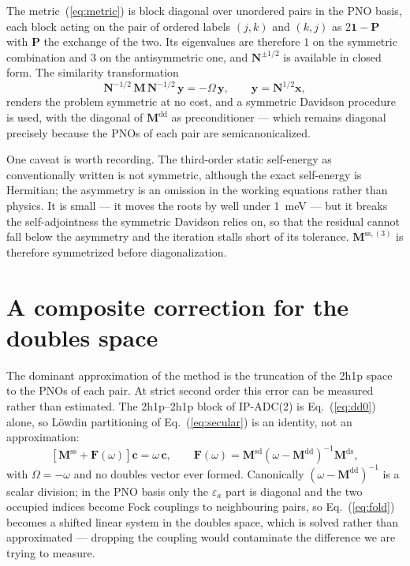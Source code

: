 \documentclass[aip,jcp,amsmath,amssymb,preprint,superscriptaddress]{revtex4-2}%
\newcommand{\Mss}{\mathbf{M}^{\text{ss}}}
\newcommand{\Msd}{\mathbf{M}^{\text{sd}}}
\newcommand{\Mds}{\mathbf{M}^{\text{ds}}}
\newcommand{\Mdd}{\mathbf{M}^{\text{dd}}}
\begin{document}
The metric~(\ref{eq:metric}) is block diagonal over unordered pairs in the PNO
basis, each block acting on the pair of ordered labels $(j,k)$ and $(k,j)$ as
$2\mathbf{1}-\mathbf{P}$ with $\mathbf{P}$ the exchange of the two. Its
eigenvalues are therefore $1$ on the symmetric combination and $3$ on the
antisymmetric one, and $\mathbf{N}^{\pm1/2}$ is available in closed form. The
similarity transformation
%
\begin{equation}
  \mathbf{N}^{-1/2}\,\mathbf{M}\,\mathbf{N}^{-1/2}\,\mathbf{y}
    = -\Omega\,\mathbf{y},
  \qquad \mathbf{y} = \mathbf{N}^{1/2}\mathbf{x},
\end{equation}
%
renders the problem symmetric at no cost, and a symmetric Davidson
procedure\cite{Davidson1975} is used, with the diagonal of $\Mdd$ as
preconditioner --- which remains diagonal precisely because the PNOs of each
pair are semicanonicalized.

One caveat is worth recording. The third-order static self-energy as
conventionally written is not symmetric, although the exact self-energy is
Hermitian; the asymmetry is an omission in the working equations rather than
physics. It is small --- it moves the roots by well under 1~meV --- but it
breaks the self-adjointness the symmetric Davidson relies on, so that the
residual cannot fall below the asymmetry and the iteration stalls short of its
tolerance. $\mathbf{M}^{\text{ss},(3)}$ is therefore symmetrized before diagonalization.

\section{A composite correction for the doubles space}
\label{sec:correction}

The dominant approximation of the method is the truncation of the 2h1p space
to the PNOs of each pair. At strict second order this error can be measured
rather than estimated. The 2h1p--2h1p block of IP-ADC(2) is
Eq.~(\ref{eq:dd0}) alone, so L\"owdin partitioning of
Eq.~(\ref{eq:secular}) is an identity, not an approximation:\cite{Mester2023}
%
\begin{equation}
  \left[\Mss + \mathbf{F}(\omega)\right]\mathbf{c} = \omega\,\mathbf{c},
  \qquad
  \mathbf{F}(\omega) = \Msd\left(\omega-\Mdd\right)^{-1}\Mds ,
  \label{eq:fold}
\end{equation}
%
with $\Omega=-\omega$ and no doubles vector ever formed. Canonically
$(\omega-\Mdd)^{-1}$ is a scalar division; in the PNO basis only the
$\varepsilon_a$ part is diagonal and the two occupied indices become Fock
couplings to neighbouring pairs, so Eq.~(\ref{eq:fold}) becomes a shifted
linear system in the doubles space, which is solved rather than approximated
--- dropping the coupling would contaminate the difference we are trying to
measure.
\end{document}
